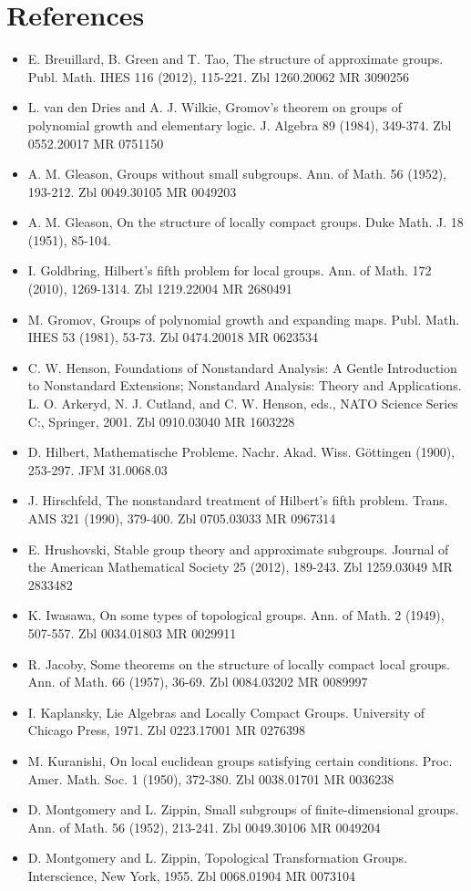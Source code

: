 \documentclass[10pt]{article}
\begin{document}
\section*{References}
\begin{itemize}
  \item[] [1] E. Breuillard, B. Green and T. Tao, The structure of approximate groups. Publ. Math. IHES 116 (2012), 115-221. Zbl 1260.20062 MR 3090256
  \item[] [2] L. van den Dries and A. J. Wilkie, Gromov's theorem on groups of polynomial growth and elementary logic. J. Algebra 89 (1984), 349-374. Zbl 0552.20017 MR 0751150
  \item[] [3] A. M. Gleason, Groups without small subgroups. Ann. of Math. 56 (1952), 193-212. Zbl 0049.30105 MR 0049203
  \item[] [4] A. M. Gleason, On the structure of locally compact groups. Duke Math. J. 18 (1951), 85-104.
  \item[] [5] I. Goldbring, Hilbert's fifth problem for local groups. Ann. of Math. 172 (2010), 1269-1314. Zbl 1219.22004 MR 2680491
  \item[] [6] M. Gromov, Groups of polynomial growth and expanding maps. Publ. Math. IHES 53 (1981), 53-73. Zbl 0474.20018 MR 0623534
  \item[] [7] C. W. Henson, Foundations of Nonstandard Analysis: A Gentle Introduction to Nonstandard Extensions; Nonstandard Analysis: Theory and Applications. L. O. Arkeryd, N. J. Cutland, and C. W. Henson, eds., NATO Science Series C:, Springer, 2001. Zbl 0910.03040 MR 1603228
  \item[] [8] D. Hilbert, Mathematische Probleme. Nachr. Akad. Wiss. Göttingen (1900), 253-297. JFM 31.0068.03
  \item[] [9] J. Hirschfeld, The nonstandard treatment of Hilbert's fifth problem. Trans. AMS 321 (1990), 379-400. Zbl 0705.03033 MR 0967314
  \item[] [10] E. Hrushovski, Stable group theory and approximate subgroups. Journal of the American Mathematical Society 25 (2012), 189-243. Zbl 1259.03049 MR 2833482
  \item[] [11] K. Iwasawa, On some types of topological groups. Ann. of Math. 2 (1949), 507-557. Zbl 0034.01803 MR 0029911
  \item[] [12] R. Jacoby, Some theorems on the structure of locally compact local groups. Ann. of Math. 66 (1957), 36-69. Zbl 0084.03202 MR 0089997
  \item[] [13] I. Kaplansky, Lie Algebras and Locally Compact Groups. University of Chicago Press, 1971. Zbl 0223.17001 MR 0276398
  \item[] [14] M. Kuranishi, On local euclidean groups satisfying certain conditions. Proc. Amer. Math. Soc. 1 (1950), 372-380. Zbl 0038.01701 MR 0036238
  \item[] [15] D. Montgomery and L. Zippin, Small subgroups of finite-dimensional groups. Ann. of Math. 56 (1952), 213-241. Zbl 0049.30106 MR 0049204
  \item[] [16] D. Montgomery and L. Zippin, Topological Transformation Groups. Interscience, New York, 1955. Zbl 0068.01904 MR 0073104
\end{itemize}
\end{document}

